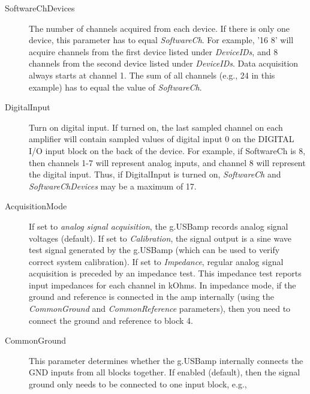 \documentclass[letterpaper, oneside, 12pt]{article}
\begin{document}
\begin{description}
 \item [SoftwareChDevices] The number of channels acquired from each device. 
                           If there is only one device, this parameter has to equal \textit{SoftwareCh}.
                           For example, '16 8' will acquire channels from the 
                           first device listed under \textit{DeviceIDs}, and 8 channels
                           from the second device listed under \textit{DeviceIDs}.
                           Data acquisition always starts at channel 1.
                           The sum of all channels (e.g., 24 in this example) has to 
                           equal the value of \textit{SoftwareCh}.
 \item [DigitalInput]      Turn on digital input. If turned on, the last sampled channel
                           on each amplifier will contain sampled values of  
                           digital input 0 on the DIGITAL I/O input block on the 
                           back of the device. For example, if SoftwareCh is 8, then
                           channels 1-7 will represent analog inputs, and channel 8 will
                           represent the digital input. Thus, if DigitalInput is turned on,
                           \textit{SoftwareCh} and \textit{SoftwareChDevices}
                           may be a maximum of 17.
 \item [AcquisitionMode]   If set to \emph{analog signal acquisition}, the g.USBamp records
                           analog signal voltages (default). If set to \emph{Calibration},
                           the signal output is a sine wave test signal generated by the g.USBamp
                           (which can be used to verify correct system calibration). 
                           If set to \emph{Impedance}, regular analog signal acquisition is
                           preceded by an impedance test. This impedance test reports 
                           input impedances for each channel in kOhms. In impedance mode,
                           if the ground and reference is connected in the amp internally
                           (using the \emph{CommonGround} and \emph{CommonReference} parameters),
                           then you need to connect the ground and reference to block 4.
 \item [CommonGround]      This parameter determines whether the g.USBamp internally connects
                           the GND inputs from all blocks together. If enabled (default), then
                           the signal ground only needs to be connected to one input block, e.g.,

\end{description}
\end{document}

